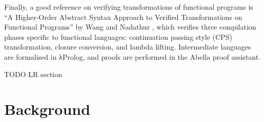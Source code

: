 \documentclass[bsc,frontabs,oneside,singlespacing,parskip,deptreport]{infthesis}
\theoremstyle{definition}
\theoremstyle{lemma}
\begin{document}
Finally, a good reference on verifying transformations of functional
programs is ``A Higher-Order Abstract Syntax Approach to Verified
Transformations on Functional Programs'' by Wang and Nadathur
\cite{DBLP:conf/esop/WangN16}, which verifies three compilation phases
specific to functional languages: continuation passing style (CPS)
transformation, closure conversion, and lambda lifting. Intermediate
languages are formalised in λProlog, and proofs are performed in the
Abella proof assistant.

TODO LR section








\chapter{Background}
\label{cha:background}
\end{document}
